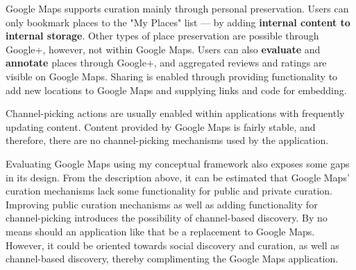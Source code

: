 {Google Maps supports curation mainly through personal preservation. Users can only bookmark places to the "My Places" list --- by adding \textbf{internal content to internal storage}. Other types of place preservation are possible through Google+, however, not within Google Maps. Users can also \textbf{evaluate} and \textbf{annotate} places through Google+, and aggregated reviews and ratings are visible on Google Maps. Sharing is enabled through providing functionality to add new locations to Google Maps and supplying links and code for embedding.  

Channel-picking actions are usually enabled within applications with frequently updating content. Content provided by Google Maps is fairly stable, and therefore, there are no channel-picking mechanisms used by the application.

Evaluating Google Maps using my conceptual framework also exposes some gaps in its design. From the description above, it can be estimated that Google Maps' curation mechanisms lack some functionality for public and private curation. Improving public curation mechanisms as well as adding functionality for channel-picking introduces the possibility of channel-based discovery. By no means should an application like that be a replacement to Google Maps. However, it could be oriented towards social discovery and curation, as well as channel-based discovery, thereby complimenting the Google Maps application.  

} %

